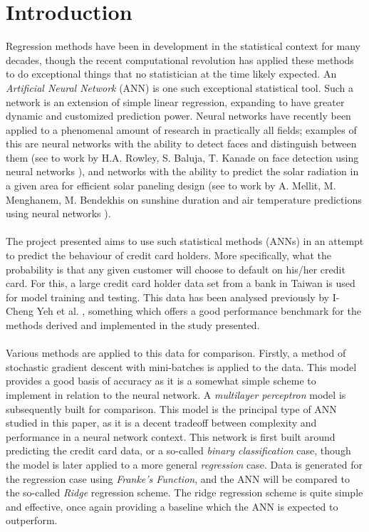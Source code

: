 \section{Introduction}
    Regression methods have been in development in the statistical context for many decades, though the recent computational revolution has applied these methods to do exceptional things that no statistician at the time likely expected. An \textit{Artificial Neural Network} (ANN) is one such exceptional statistical tool. Such a network is an extension of simple linear regression, expanding to have greater dynamic and customized prediction power. Neural networks have recently been applied to a phenomenal amount of research in practically all fields; examples of this are neural networks with the ability to detect faces and distinguish between them (see to work by H.A. Rowley, S. Baluja, T. Kanade on face detection using neural networks \cite{NNWfacedetection}), and networks with the ability to predict the solar radiation in a given area for efficient solar paneling design (see to work by A. Mellit, M. Menghanem, M. Bendekhis on sunshine duration and air temperature predictions using neural networks \cite{NNWsunshine}). \\\\
    The project presented aims to use such statistical methods (ANNs) in an attempt to predict the behaviour of credit card holders. More specifically, what the probability is that any given customer will choose to default on his/her credit card. For this, a large credit card holder data set from a bank in Taiwan is used for model training and testing. This data has been analysed previously by I-Cheng Yeh et al. \cite{CCdata}, something which offers a good performance benchmark for the methods derived and implemented in the study presented. \\\\
    Various methods are applied to this data for comparison. Firstly, a method of stochastic gradient descent with mini-batches is applied to the data. This model provides a good basis of accuracy as it is a somewhat simple scheme to implement in relation to the neural network. A \textit{multilayer perceptron} model is subsequently built for comparison. This model is the principal type of ANN studied in this paper, as it is a decent tradeoff between complexity and performance in a neural network context. This network is first built around predicting the credit card data, or a so-called \textit{binary classification} case, though the model is later applied to a more general \textit{regression} case. Data is generated for the regression case using \textit{Franke's Function}, and the ANN will be compared to the so-called \textit{Ridge} regression scheme. The ridge regression scheme is quite simple and effective, once again providing a baseline which the ANN is expected to outperform.\\\\
